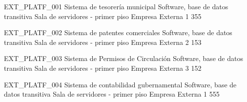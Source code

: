 \informationResource
{EXT\_PLATF\_001}
{Sistema de tesorería municipal}
{Software, base de datos transitiva}
{Sala de servidores - primer piso}
{Empresa Externa 1}
{3}{5}{5}
{
    \threatPentested
    \threatNoInteroperation
    \threatNoEncryption
    \threatEnternalized
    \threatEnternalizedManteinance
    \threatNoTransactionRegistry
}

\informationResource
{EXT\_PLATF\_002}
{Sistema de patentes comerciales}
{Software, base de datos transitiva}
{Sala de servidores - primer piso}
{Empresa Externa 2}
{1}{5}{3}
{
    \threatNoPhysicalBackup
    \threatNoInteroperation
    \threatNoEncryption
    \threatEnternalized
    \threatEnternalizedManteinance
}

\informationResource
{EXT\_PLATF\_003}
{Sistema de Permisos de Circulación}
{Software, base de datos transitiva}
{Sala de servidores - primer piso}
{Empresa Externa 3}
{1}{5}{2}
{
    \threatNoDigitalBackup
    \threatNoInteroperation
    \threatNoEncryption
    \threatEnternalized
    \threatNoDRP
}

\informationResource
{EXT\_PLATF\_004}
{Sistema de contabilidad gubernamental}
{Software, base de datos transitiva}
{Sala de servidores - primer piso}
{Empresa Externa 1}
{5}{5}{5}
{
    \threatValue
    \threatInterest
    \threatPentested
    \threatNoInteroperation
    \threatNoEncryption
    \threatEnternalized
    \threatEnternalizedManteinance
    \threatNoTransactionRegistry
}
